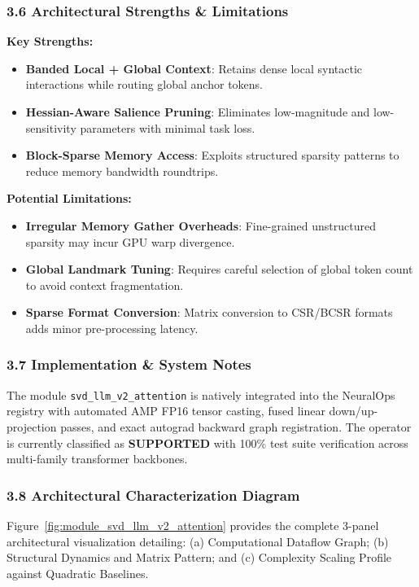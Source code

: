 \subsubsection*{3.6 Architectural Strengths \& Limitations}
\textbf{Key Strengths:}
\begin{itemize}
    \item \textbf{Banded Local + Global Context}: Retains dense local syntactic interactions while routing global anchor tokens.
    \item \textbf{Hessian-Aware Salience Pruning}: Eliminates low-magnitude and low-sensitivity parameters with minimal task loss.
    \item \textbf{Block-Sparse Memory Access}: Exploits structured sparsity patterns to reduce memory bandwidth roundtrips.
\end{itemize}

\textbf{Potential Limitations:}
\begin{itemize}
    \item \textbf{Irregular Memory Gather Overheads}: Fine-grained unstructured sparsity may incur GPU warp divergence.
    \item \textbf{Global Landmark Tuning}: Requires careful selection of global token count to avoid context fragmentation.
    \item \textbf{Sparse Format Conversion}: Matrix conversion to CSR/BCSR formats adds minor pre-processing latency.
\end{itemize}

\subsubsection*{3.7 Implementation \& System Notes}
The module \texttt{svd\_llm\_v2\_attention} is natively integrated into the NeuralOps registry with automated AMP FP16 tensor casting, fused linear down/up-projection passes, and exact autograd backward graph registration. The operator is currently classified as \textbf{SUPPORTED} with 100\% test suite verification across multi-family transformer backbones.

\subsubsection*{3.8 Architectural Characterization Diagram}
Figure~\ref{fig:module_svd_llm_v2_attention} provides the complete 3-panel architectural visualization detailing: (a) Computational Dataflow Graph; (b) Structural Dynamics and Matrix Pattern; and (c) Complexity Scaling Profile against Quadratic Baselines.

